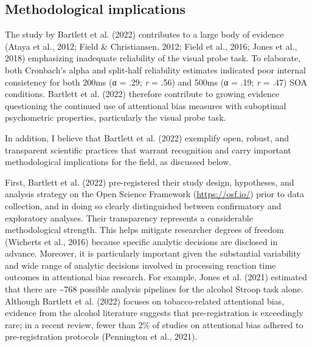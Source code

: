 \documentclass[authordate, empirical]{jote-new-article}
\begin{document}
	\subsection{Methodological implications}



	The study by Bartlett et al. (2022) contributes to a large body of evidence (Ataya et al., 2012; Field \& Christiansen, 2012; Field et al., 2016; Jones et al., 2018) emphasizing inadequate reliability of the visual probe task. To elaborate, both Cronbach's alpha and split-half reliability estimates indicated poor internal consistency for both 200ms (α = .29; \emph{r} = .56) and 500ms (α = .19; \emph{r} = .47) SOA conditions. Bartlett et al. (2022) therefore contribute to growing evidence questioning the continued use of attentional bias measures with suboptimal psychometric properties, particularly the visual probe task.



	In addition, I believe that Bartlett et al. (2022) exemplify open, robust, and transparent scientific practices that warrant recognition and carry important methodological implications for the field, as discussed below.



	First, Bartlett et al. (2022) pre-registered their study design, hypotheses, and analysis strategy on the Open Science Framework (\href{https://osf.io/}{https://osf.io/}) prior to data collection, and in doing so clearly distinguished between confirmatory and exploratory analyses. Their transparency represents a considerable methodological strength. This helps mitigate researcher degrees of freedom (Wicherts et al., 2016) because specific analytic decisions are disclosed in advance. Moreover, it is particularly important given the substantial variability and wide range of analytic decisions involved in processing reaction time outcomes in attentional bias research. For example, Jones et al. (2021) estimated that there are \textasciitilde{}768 possible analysis pipelines for the alcohol Stroop task alone. Although Bartlett et al. (2022) focuses on tobacco-related attentional bias, evidence from the alcohol literature suggests that pre-registration is exceedingly rare; in a recent review, fewer than 2\% of studies on attentional bias adhered to pre-registration protocols (Pennington et al., 2021).
\end{document}
